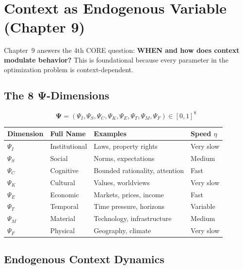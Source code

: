 \section{Context as Endogenous Variable (Chapter 9)}
\label{sec:mp-context}

Chapter~9 answers the 4th CORE question: \textbf{WHEN and how does context modulate behavior?}
This is foundational because every parameter in the optimization problem is context-dependent.

\subsection{The 8 Ψ-Dimensions}

\begin{equation}
\boxed{
\boldsymbol{\Psi} = (\Psi_I, \Psi_S, \Psi_C, \Psi_K, \Psi_E, \Psi_T, \Psi_M, \Psi_F) \in [0,1]^8
}
\label{eq:mp-8psi}
\end{equation}

\begin{center}
\renewcommand{\arraystretch}{1.2}
\small
\begin{tabular}{@{}llll@{}}
\toprule
\textbf{Dimension} & \textbf{Full Name} & \textbf{Examples} & \textbf{Speed $\eta$} \\
\midrule
$\Psi_I$ & Institutional & Laws, property rights & Very slow \\
$\Psi_S$ & Social & Norms, expectations & Medium \\
$\Psi_C$ & Cognitive & Bounded rationality, attention & Fast \\
$\Psi_K$ & Cultural & Values, worldviews & Very slow \\
$\Psi_E$ & Economic & Markets, prices, income & Fast \\
$\Psi_T$ & Temporal & Time pressure, horizons & Variable \\
$\Psi_M$ & Material & Technology, infrastructure & Medium \\
$\Psi_F$ & Physical & Geography, climate & Very slow \\
\bottomrule
\end{tabular}
\end{center}

\subsection{Endogenous Context Dynamics}


